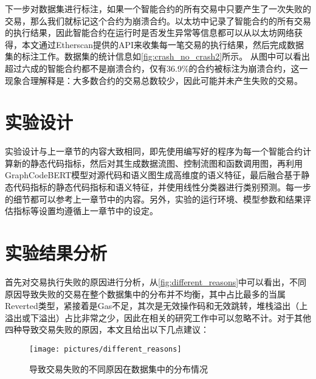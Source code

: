 下一步对数据集进行标注，如果一个智能合约的所有交易中只要产生了一次失败的交易，那么我们就标记这个合约为崩溃合约。以太坊中记录了智能合约的所有交易的执行结果，因此智能合约在运行时是否发生异常等信息都可以从以太坊网络获得，本文通过Etherscan提供的API来收集每一笔交易的执行结果，然后完成数据集的标注工作。数据集的统计信息如\autoref{fig:crash_no_crash2}所示。
从图中可以看出超过六成的智能合约都不是崩溃合约，仅有36.9\%的合约被标注为崩溃合约，这一现象合理解释是：大多数合约的交易总数较少，因此可能并未产生失败的交易。











\section{实验设计}
\label{sec:实验设计}
实验设计与上一章节的内容大致相同，即先使用编写好的程序为每一个智能合约计算新的静态代码指标，然后对其生成数据流图、控制流图和函数调用图，再利用GraphCodeBERT模型对源代码和语义图生成高维度的语义特征，最后融合基于静态代码指标的静态代码指标和语义特征，并使用线性分类器进行类别预测。每一步的细节都可以参考上一章节中的内容。另外，实验的运行环境、模型参数和结果评估指标等设置均遵循上一章节中的设定。
\section{实验结果分析}
\label{sec:实验结果分析2}
首先对交易执行失败的原因进行分析，从\autoref{fig:different_reasons}中可以看出，不同原因导致失败的交易在整个数据集中的分布并不均衡，其中占比最多的当属Reverted类型，紧接着是Gas不足，其次是无效操作码和无效跳转，堆栈溢出（上溢出或下溢出）占比非常之少，因此在相关的研究工作中可以忽略不计。对于其他四种导致交易失败的原因，本文且给出以下几点建议：
\begin{figure}[htbp]
    \centering
    \texttt{[image: pictures/different\_reasons]}
    \caption{\label{fig:different_reasons}导致交易失败的不同原因在数据集中的分布情况}
\end{figure}

